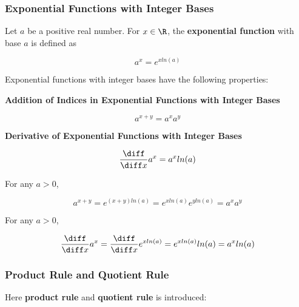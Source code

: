 \subsubsection{Exponential Functions with Integer Bases}
\begin{dft}
  Let $a$ be a positive real number. For $x\in\R$, the \textbf{exponential function} with base $a$ is defined as

  $$a^{x}=e^{xln(a)}$$
\end{dft}\n

\begin{thm}
  Exponential functions with integer bases have the following properties:

  \begin{alist}
    \item \textbf{Addition of Indices in Exponential Functions with Integer Bases}

    $$a^{x+y}=a^{x}a^{y}$$

    \item \textbf{Derivative of Exponential Functions with Integer Bases}

    $$\frac{\diff }{\diff  x}a^{x}=a^{x}ln(a)$$
  \end{alist}

   For any $a>0$,

  $$a^{x+y}=e^{(x+y)ln(a)}=e^{xln(a)}e^{yln(a)}=a^{x}a^{y}$$\s

   For any $a>0$,

  $$\frac{\diff }{\diff  x}a^{x}=\frac{\diff }{\diff  x}e^{xln(a)}=e^{xln(a)}ln(a)=a^{x}ln(a)$$
\end{thm}

\subsubsection{Product Rule and Quotient Rule}
Here \textbf{product rule} and \textbf{quotient rule} is introduced:\n

